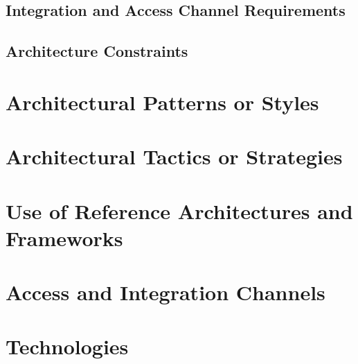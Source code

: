 \documentclass[11pt,a4paper,titlepage]{article}
\begin{document}
	\subsection{Integration and Access Channel Requirements}
	
	
	
	\subsection{Architecture Constraints}
	
\section{Architectural Patterns or Styles}
	

\section{Architectural Tactics or Strategies}

\section{Use of Reference Architectures and Frameworks}

\section{Access and Integration Channels}

\section{Technologies}



	
\end{document}
